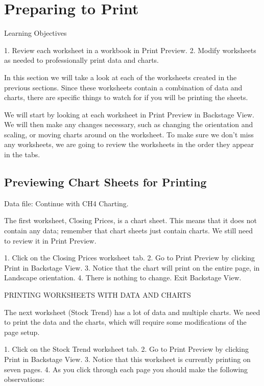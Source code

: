 \section{Preparing to Print}




Learning Objectives


1. Review each worksheet in a workbook in Print Preview.
2. Modify worksheets as needed to professionally print data and charts.



In this section we will take a look at each of the worksheets created in the previous sections. Since
these worksheets contain a combination of data and charts, there are specific things to watch for if
you will be printing the sheets.

We will start by looking at each worksheet in Print Preview in Backstage View. We will then make
any changes necessary, such as changing the orientation and scaling, or moving charts around on the
worksheet. To make sure we don’t miss any worksheets, we are going to review the worksheets in the
order they appear in the tabs.

\subsection{Previewing Chart Sheets for Printing}

Data file: Continue with CH4 Charting.

The first worksheet, Closing Prices, is a chart sheet. This means that it does not contain any data;
remember that chart sheets just contain charts. We still need to review it in Print Preview.

1.   Click on the Closing Prices worksheet tab.
2.   Go to Print Preview by clicking Print in Backstage View.
3.   Notice that the chart will print on the entire page, in Landscape orientation.
4.   There is nothing to change. Exit Backstage View.

PRINTING WORKSHEETS WITH DATA AND CHARTS

The next worksheet (Stock Trend) has a lot of data and multiple charts. We need to print the data and
the charts, which will require some modifications of the page setup.

1.   Click on the Stock Trend worksheet tab.
2.   Go to Print Preview by clicking Print in Backstage View.
3.   Notice that this worksheet is currently printing on seven pages.
4.   As you click through each page you should make the following observations:



